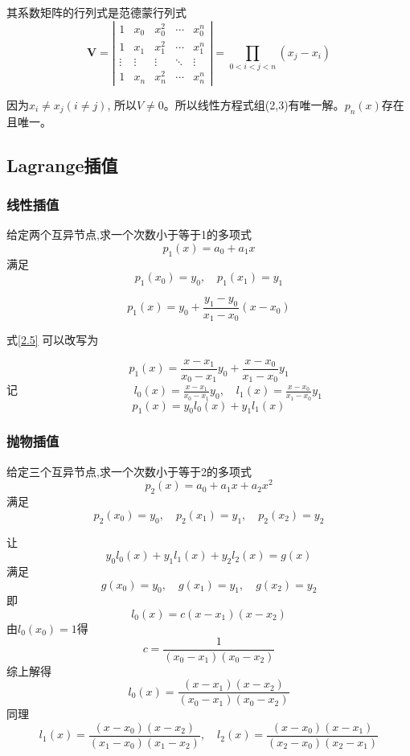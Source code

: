 \documentclass[12pt]{article}
\numberwithin{equation}{section}
\begin{document}
	其系数矩阵的行列式是范德蒙行列式
	\begin{equation}
		\boldsymbol{V}=\left|\begin{array}{ccccc}
		1 & x_{0} & x_{0}^{2} & \cdots & x_{0}^{n} \\
		1 & x_{1} & x_{1}^{2} & \cdots & x_{1}^{n} \\
		\vdots & \vdots & \vdots & \ddots & \vdots \\
		1 & x_{n} & x_{n}^{2} & \cdots & x_{n}^{n}
		\end{array}\right|=\prod_{0<i<j<n}\left(x_{j}-x_{i}\right)
	\end{equation}

	因为$x_i \neq x_j (i \neq j)$, 所以$V \neq 0$。所以线性方程式组(2,3)有唯一解。$p_n(x)$存在且唯一。

	\subsection{Lagrange插值}

	\subsubsection{线性插值}
	给定两个互异节点,求一个次数小于等于1的多项式
	$$
	p_1 (x) = a_0 + a_1 x
	$$
	满足
	$$
	p_1 (x_0) = y_0 , \quad p_1 (x_1) = y_1
	$$

	\begin{equation} \tag{2.5} \label{2.5}
		p_1 (x) = y_0 + \frac{y_1 - y_0}{x_1 - x_0} (x - x_0)
	\end{equation}

	式\eqref{2.5} 可以改写为

	\begin{equation} \tag{2.6} \label{2.6}
		p_1 (x) = \frac{x - x_1}{x_0 - x_1} y_0 + \frac{x - x_0}{x_1 - x_0} y_1
	\end{equation}
	记 $\quad \quad \quad \quad \quad \quad \quad \quad \quad \quad l_0 (x) = \frac{x - x_1}{x_0 - x_1} y_0 , \quad l_1 (x) = \frac{x - x_0}{x_1 - x_0} y_1$
	$$
	p_1 (x) = y_0 l_0 (x) + y_1 l_1 (x)
	$$

	\subsubsection{抛物插值}
	给定三个互异节点,求一个次数小于等于2的多项式
	$$
	p_2 (x) = a_0 + a_1 x + a_2 x^2
	$$
	满足
	$$
	p_2 (x_0) = y_0 , \quad p_2 (x_1) = y_1 , \quad p_2 (x_2) = y_2
	$$
	
	让
	$$
	y_0 l_0 (x) + y_1 l_1 (x) + y_2 l_2 (x) = g(x)
	$$
	满足
	$$
	g(x_0) = y_0 , \quad g(x_1) = y_1 , \quad g(x_2) = y_2
	$$
	即
	$$
	l_0 (x) = c(x - x_1)(x - x_2)
	$$
	由$l_0 (x_0) = 1$得
	$$
	c = \frac{1}{(x_0 - x_1)(x_0 - x_2)}
	$$
	综上解得
	$$
	l_0 (x) = \frac{(x - x_1)(x - x_2)}{(x_0 - x_1)(x_0 - x_2)}
	$$
	同理
	$$
	l_1 (x) = \frac{(x - x_0)(x - x_2)}{(x_1 - x_0)(x_1 - x_2)} , \quad l_2 (x) = \frac{(x - x_0)(x - x_1)}{(x_2 - x_0)(x_2 - x_1)}
	$$
\end{document}
